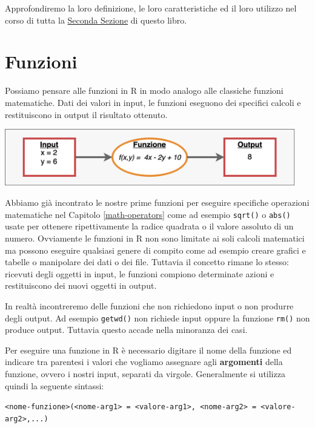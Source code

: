 \documentclass[
]{book}
\begin{document}
Approfondiremo la loro definizione, le loro caratteristiche ed il loro utilizzo nel corso di tutta la \protect\hyperlink{second-section}{Seconda Sezione} di questo libro.

\hypertarget{functions-def}{%
\section{Funzioni}\label{functions-def}}

Possiamo pensare alle funzioni in R in modo analogo alle classiche funzioni matematiche. Dati dei valori in input, le funzioni eseguono dei specifici calcoli e restituiscono in output il risultato ottenuto.

\includegraphics[width=0.95\textwidth,height=\textheight]{images/functions-graph.png}

Abbiamo già incontrato le nostre prime funzioni per eseguire specifiche operazioni matematiche nel Capitolo \ref{math-operators} come ad esempio \texttt{sqrt()} o \texttt{abs()} usate per ottenere ripettivamente la radice quadrata o il valore assoluto di un numero. Ovviamente le funzioni in R non sono limitate ai soli calcoli matematici ma possono eseguire qualsiasi genere di compito come ad esempio creare grafici e tabelle o manipolare dei dati o dei file. Tuttavia il concetto rimane lo stesso: ricevuti degli oggetti in input, le funzioni compiono determinate azioni e restituiscono dei nuovi oggetti in output.

In realtà incontreremo delle funzioni che non richiedono input o non produrre degli output. Ad esempio \texttt{getwd()} non richiede input oppure la funzione \texttt{rm()} non produce output. Tuttavia questo accade nella minoranza dei casi.

Per eseguire una funzione in R è necessario digitare il nome della funzione ed indicare tra parentesi i valori che vogliamo assegnare agli \textbf{argomenti} della funzione, ovvero i nostri input, separati da virgole. Generalmente si utilizza quindi la seguente sintassi:

\texttt{\textless{}nome-funzione\textgreater{}(\textless{}nome-arg1\textgreater{}\ =\ \textless{}valore-arg1\textgreater{},\ \textless{}nome-arg2\textgreater{}\ =\ \textless{}valore-arg2\textgreater{},...)}
\end{document}
